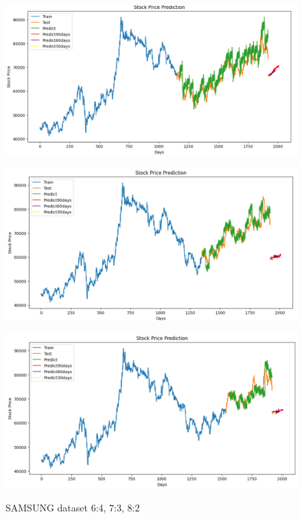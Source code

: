 \documentclass[conference]{IEEEtran}
\begin{document}
\begin{figure}[H]
    \centering
    \begin{minipage}{0.15\textwidth}
    \centering
    \includegraphics[width=1\textwidth]{Image/NBeat/N_BEAT_SAMSUNG_6_4.png}
   
    \label{fig:1}
    \end{minipage}%
    \begin{minipage}{0.15\textwidth}
    \centering
    \includegraphics[width=1\textwidth]{Image/NBeat/N_BEAT_SAMSUNG_7_3.png}
  
    \label{fig:2}
    \end{minipage}%
    \begin{minipage}{0.15\textwidth}
    \centering
    \includegraphics[width=1\textwidth]{Image/NBeat/N_BEAT_SAMSUNG_8_2.png}

    \label{fig:3}
    \end{minipage}
    \caption{SAMSUNG dataset 6:4, 7:3, 8:2}
\end{figure}
\end{document}
